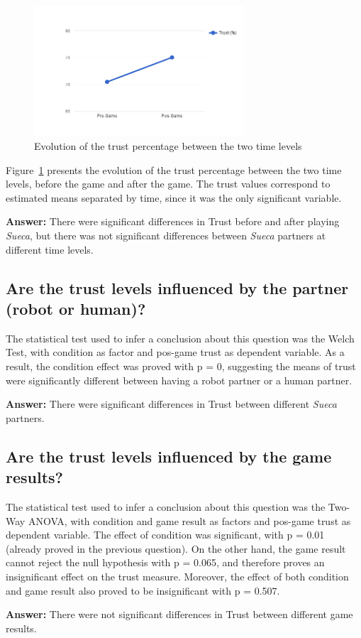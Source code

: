 \begin{figure}[h!]
  \centering
    \includegraphics[width=0.7\textwidth]{./img/6/trustMixedANOVA}
  \caption{Evolution of the trust percentage between the two time levels}
\label{fig:trustMixedANOVA}
\end{figure}

Figure~\ref{fig:trustMixedANOVA} presents the evolution of the trust percentage between the two time levels, before the game and after the game.
The trust values correspond to estimated means separated by time, since it was the only significant variable.

\textbf{Answer:} There were significant differences in Trust before and after playing \emph{Sueca}, but there was not significant differences between \emph{Sueca} partners at different time levels.



\subsection*{Are the trust levels influenced by the partner (robot or human)?}
The statistical test used to infer a conclusion about this question was the Welch Test, with condition as factor and pos-game trust as dependent variable.
As a result, the condition effect was proved with p = 0, suggesting the means of trust were significantly different between having a robot partner or a human partner.

\textbf{Answer:} There were significant differences in Trust between different \emph{Sueca} partners.


\subsection*{Are the trust levels influenced by the game results?}
The statistical test used to infer a conclusion about this question was the Two-Way ANOVA, with condition and game result as factors and pos-game trust as dependent variable.
The effect of condition was significant, with p = 0.01 (already proved in the previous question).
On the other hand, the game result cannot reject the null hypothesis with p = 0.065, and therefore proves an insignificant effect on the trust measure.
Moreover, the effect of both condition and game result also proved to be insignificant with p = 0.507.

\textbf{Answer:} There were not significant differences in Trust between different game results.


\clearpage
